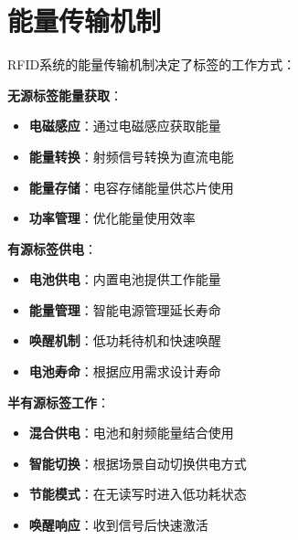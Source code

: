 \documentclass[12pt,UTF8]{ctexbook}
\begin{document}
\section{能量传输机制}

RFID系统的能量传输机制决定了标签的工作方式：

\textbf{无源标签能量获取}：
\begin{itemize}[leftmargin=3.5em]
    \item \textbf{电磁感应}：通过电磁感应获取能量
    \item \textbf{能量转换}：射频信号转换为直流电能
    \item \textbf{能量存储}：电容存储能量供芯片使用
    \item \textbf{功率管理}：优化能量使用效率
\end{itemize}

\textbf{有源标签供电}：
\begin{itemize}[leftmargin=3.5em]
    \item \textbf{电池供电}：内置电池提供工作能量
    \item \textbf{能量管理}：智能电源管理延长寿命
    \item \textbf{唤醒机制}：低功耗待机和快速唤醒
    \item \textbf{电池寿命}：根据应用需求设计寿命
\end{itemize}

\textbf{半有源标签工作}：
\begin{itemize}[leftmargin=3.5em]
    \item \textbf{混合供电}：电池和射频能量结合使用
    \item \textbf{智能切换}：根据场景自动切换供电方式
    \item \textbf{节能模式}：在无读写时进入低功耗状态
    \item \textbf{唤醒响应}：收到信号后快速激活
\end{itemize}
\end{document}
